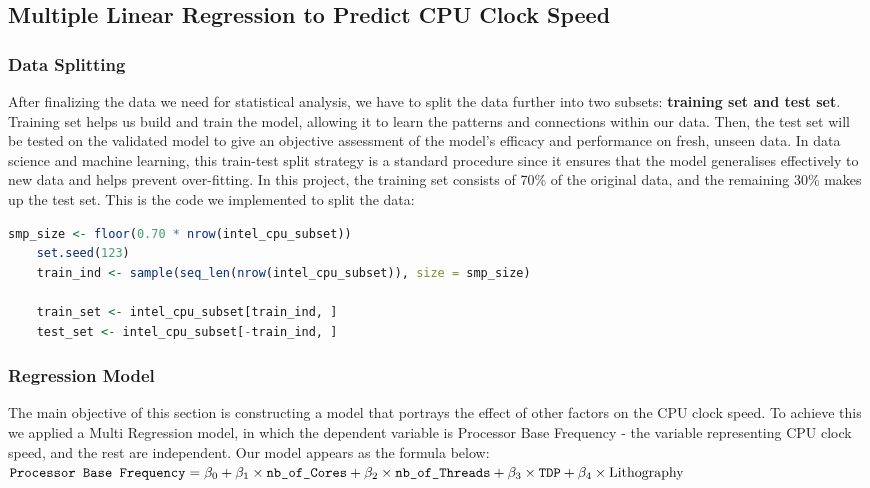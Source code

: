 \subsection{Multiple Linear Regression to Predict CPU Clock Speed}

\subsubsection{Data Splitting}
After finalizing the data we need for statistical analysis, we have to split the data further into two subsets: \textbf{training set and test set}. Training set helps us build and train the model, allowing it to learn the patterns and connections within our data. Then, the test set will be tested on the validated model to give an objective assessment of the model's efficacy and performance on fresh, unseen data. In data science and machine learning, this train-test split strategy is a standard procedure since it ensures that the model generalises effectively to new data and helps prevent over-fitting. In this project, the training set consists of 70\% of the original data, and the remaining 30\% makes up the test set. This is the code we implemented to split the data:

\begin{lstlisting}[language=R]
    smp_size <- floor(0.70 * nrow(intel_cpu_subset))
    set.seed(123)
    train_ind <- sample(seq_len(nrow(intel_cpu_subset)), size = smp_size)
    
    train_set <- intel_cpu_subset[train_ind, ]
    test_set <- intel_cpu_subset[-train_ind, ]
\end{lstlisting}

\subsubsection{Regression Model}
The main objective of this section is constructing a model that portrays the effect of other factors on the CPU clock speed. To achieve this we applied a Multi Regression model, in which the dependent variable is Processor Base Frequency - the variable representing CPU clock speed, and the rest are independent. Our model appears as the formula below:\\

$\text{\texttt{Processor Base Frequency}} = \beta_0 + \beta_1 \times\text{\texttt{nb\_of\_Cores}} + \beta_2 \times\text{\texttt{nb\_of\_Threads}} + \beta_3 \times\text{\texttt{TDP}} + \beta_4 \times\text{\text{Lithography}}$ \\

